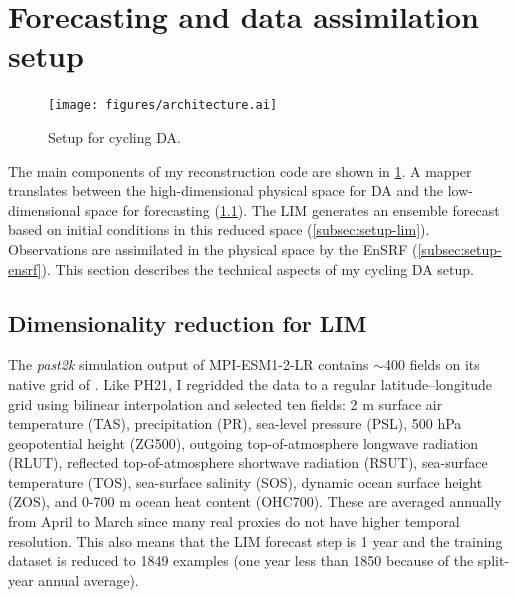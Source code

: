 \documentclass[parskip=half,DIV=16]{scrartcl}
\begin{document}
\section{Forecasting and data assimilation setup}

\begin{figure}[h]
    \centering
    \texttt{[image: figures/architecture.ai]}
    \caption{Setup for cycling \gls{DA}.}
    \label{fig:arch}
\end{figure}

The main components of my reconstruction code are shown in \cref{fig:arch}. A mapper translates between the high-dimensional physical space for \gls{DA} and the low-dimensional space for forecasting (\cref{subsec:setup-dimred}). The \gls{LIM} generates an ensemble forecast based on initial conditions in this reduced space (\cref{subsec:setup-lim}). Observations are assimilated in the physical space by the \gls{EnSRF} (\cref{subsec:setup-ensrf}). This section describes the technical aspects of my cycling \gls{DA} setup.


\subsection{Dimensionality reduction for LIM}
\label{subsec:setup-dimred}

The \emph{past2k} simulation output of MPI-ESM1-2-LR contains $\sim$400 fields on its native grid of . Like PH21, I regridded the data to a regular  latitude--longitude grid using bilinear interpolation and selected ten fields: 2 m surface air temperature (TAS), precipitation (PR), sea-level pressure (PSL), 500 hPa geopotential height (ZG500), outgoing top-of-atmosphere longwave radiation (RLUT), reflected top-of-atmosphere shortwave radiation (RSUT), sea-surface temperature (TOS), sea-surface salinity (SOS), dynamic ocean surface height (ZOS), and 0-700 m ocean heat content (OHC700). These are averaged annually from April to March since many real proxies do not have higher temporal resolution. This also means that the \gls{LIM} forecast step is 1 year and the training dataset is reduced to 1849 examples (one year less than 1850 because of the split-year annual average).
\end{document}
